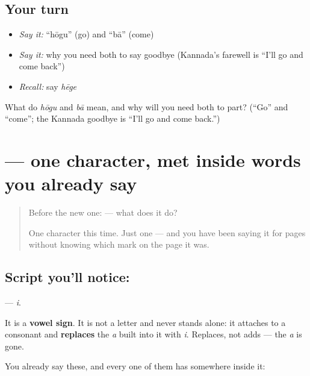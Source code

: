 \subsection*{Your turn}
\begin{itemize}
\raggedright
  \item \emph{Say it:} \textquotedblleft{}hōgu\textquotedblright{} (go) and \textquotedblleft{}bā\textquotedblright{} (come)
  \item \emph{Say it:} why you need both to say goodbye (Kannada's farewell is \textquotedblleft{}I'll go and come back\textquotedblright{})
  \item \emph{Recall:} say \emph{hēge}
\end{itemize}

\begin{tcolorbox}[breakable,colback=teal!4,colframe=teal!35!black,title={Before you move on}]
What do \emph{hōgu} and \emph{bā} mean, and why will you need both to part? (\textquotedblleft{}Go\textquotedblright{} and \textquotedblleft{}come\textquotedblright{}; the Kannada goodbye is \textquotedblleft{}I'll go and come back.\textquotedblright{})
\end{tcolorbox}
\section[\texorpdfstring{\kn{ಿ} (i)}{ಿ (i)}]{ — one character, met inside words you already say}

\label{lesson:KA-S04-vowel-sign-i}



\begin{quote}
Before the new one:  — what does it do?

One character this time. Just one — and you have been saying it for pages without knowing which mark on the page it was.
\end{quote}

\subsection*{Script you'll notice: }
\textbf{} — \emph{i}.

It is a \textbf{vowel sign}. It is not a letter and never stands alone: it attaches to a consonant and \textbf{replaces} the \emph{a} built into it with \emph{i}. Replaces, not adds — the \emph{a} is gone.

You already say these, and every one of them has  somewhere inside it:

